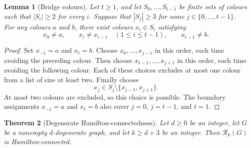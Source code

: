 \documentclass[11pt]{article}
\newtheorem{theorem}{Theorem}[section]
\newtheorem{lemma}[theorem]{Lemma}
\theoremstyle{remark}
\newcommand{\Rk}{\mathcal R_k}
\numberwithin{equation}{section}
\numberwithin{table}{section}
\begin{document}
\begin{lemma}[Bridge colours]\label{lem:bridge-colours}
Let $t\ge1$, and let $S_0,\ldots,S_{t-1}$ be finite sets of colours
such that $|S_i|\ge2$ for every $i$. Suppose that $|S_j|\ge3$ for
some $j\in\{0,\ldots,t-1\}$. For any colours $a$ and $b$, there exist
colours $x_i\in S_i$ satisfying
\[
x_0\ne a,\qquad
x_i\ne x_{i-1}\quad(1\le i\le t-1),\qquad
x_{t-1}\ne b.
\]
\end{lemma}

\begin{proof}
Set $x_{-1}=a$ and $x_t=b$. Choose $x_0,\ldots,x_{j-1}$ in this
order, each time avoiding the preceding colour. Then choose
$x_{t-1},\ldots,x_{j+1}$ in this order, each time avoiding the following
colour. Each of these choices excludes at most one colour from a list of
size at least two. Finally choose
\[
x_j\in S_j\setminus\{x_{j-1},x_{j+1}\}.
\]
At most two colours are excluded, so this choice is possible. The
boundary assignments $x_{-1}=a$ and $x_t=b$ also cover $j=0$,
$j=t-1$, and $t=1$.
\end{proof}


\begin{theorem}[Degenerate Hamilton-connectedness]\label{thm:degenerate-hc}
Let $d\ge0$ be an integer, let $G$ be a nonempty $d$-degenerate graph,
and let $k\ge d+3$ be an integer. Then $\Rk(G)$ is
Hamilton-connected.
\end{theorem}
\end{document}
